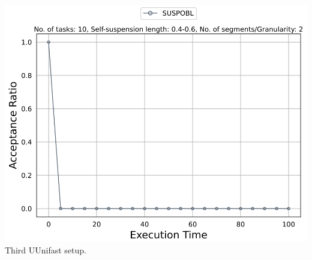 \documentclass[]{article}
\begin{document}
\begin{minipage}[t]{0.48\linewidth}
		\includegraphics[width=\linewidth]{Capture3_uunifast.png}
		Third UUnifast setup.
		\vspace{0.3cm}
		
		
	\end{minipage}\hfill
\end{document}
